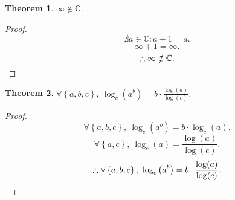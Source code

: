 \documentclass{article}
\begin{document}
\newtheorem{thm}{Theorem}
\begin{thm}
	$\infty \notin \mathbb{C}$.
\end{thm}
\begin{proof}
	\[
		\nexists a \in \mathbb{C} : a + 1 = a.
	\]
	\[
		\infty + 1 = \infty.
	\]
	\[
		\therefore \infty \notin \mathbb{C}.\qedhere
	\]
\end{proof}
\begin{thm}
	$\forall \left\{a,b,c\right\}, \ 
	\log_c\left(a^b\right) = b \cdot \frac{\log(a)}{\log(c)}$.
\end{thm}
\begin{proof}
	\[
		\forall \left\{a,b,c\right\}, \
		\log_c\left(a^b\right) =
		b \cdot \log_c\left(a\right).
	\]
	\[
		\forall \left\{a,c\right\}, \ 
		\log_c\left(a\right) =
		\frac{\log\left(a\right)}{\log\left(c\right)}.
	\]
	\[
		\therefore \forall \left\{a,b,c\right\}, \ 
		\log_c\left(a^b\right) =
		b \cdot \frac{\log(a)}{\log(c)}.\qedhere
	\]
\end{proof}
\end{document}
